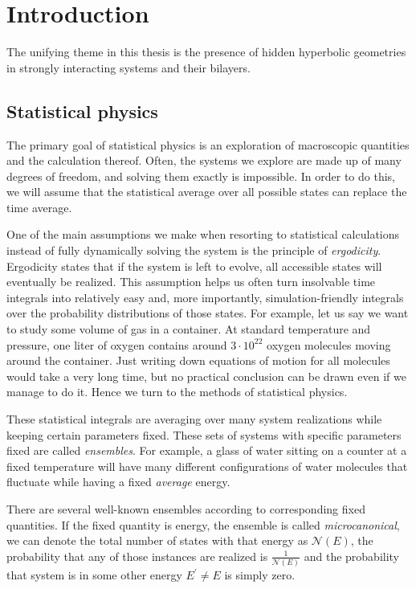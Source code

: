 \chapter{Introduction}
\label{ch:Intro}
\par
The unifying theme in this thesis is the presence of hidden hyperbolic geometries in strongly interacting systems and their bilayers. 
\newpage     
\section{Statistical physics}
\label{sec:statPhys}
The primary goal of statistical physics is an exploration of macroscopic quantities and the calculation thereof. Often, the systems we explore are made up of many degrees of freedom, and solving them exactly is impossible. In order to do this, we will assume that the statistical average over all possible states can replace the time average. 
\par 
One of the main assumptions we make when resorting to statistical calculations instead of fully dynamically solving the system is the principle of \textit{ergodicity}. Ergodicity states that if the system is left to evolve, all accessible states will eventually be realized. This assumption helps us often turn insolvable time integrals into relatively easy and, more importantly, simulation-friendly integrals over the probability distributions of those states. For example, let us say we want to study some volume of gas in a container. At standard temperature and pressure, one liter of oxygen contains around $3\cdot 10^{22}$ oxygen molecules moving around the container. Just writing down equations of motion for all molecules would take a very long time, but no practical conclusion can be drawn even if we manage to do it. Hence we turn to the methods of statistical physics.
\par
These statistical integrals are averaging over many system realizations while keeping certain parameters fixed. These sets of systems with specific parameters fixed are called \textit{ensembles}. For example, a glass of water sitting on a counter at a fixed temperature will have many different configurations of water molecules that fluctuate while having a fixed \textit{average} energy.
\par
There are several well-known ensembles according to corresponding fixed quantities. If the fixed quantity is energy, the ensemble is called \textit{microcanonical}, we can denote the total number of states with that energy as $\mathcal{N}(E)$, the probability that any of those instances are realized is $\frac{1}{\mathcal{N}(E)}$ and the probability that system is in some other energy $E^\prime \neq E$ is simply zero.
